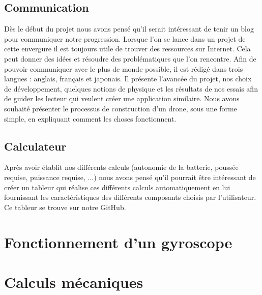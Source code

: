 \documentclass[a4paper,10pt]{report}
\begin{document}
      \section{Communication}
	Dès le début du projet nous avons pensé qu'il serait intéressant de 
tenir un blog pour communiquer notre progression. Lorsque l'on se lance dans un 
projet de cette envergure il est toujours utile de trouver des ressources sur 
Internet. Cela peut donner des idées et résoudre des problématiques que l'on 
rencontre. Afin de pouvoir communiquer avec le plus de monde possible, il est 
rédigé dans trois langues : anglais, français et japonais. Il présente 
l'avancée du projet, nos choix de développement, quelques notions de physique 
et les résultats de nos essais afin de guider les lecteur qui veulent créer une 
application similaire. Nous avons souhaité présenter le processus de 
construction d'un drone, sous une forme simple, en expliquant comment les 
choses fonctionnent.

      \section{Calculateur}
	Après avoir établit nos différents calculs (autonomie de la batterie, 
poussée requise, puissance requise, ...) nous avons pensé qu'il pourrait être 
intéressant de créer un tableur qui réalise ces différents calculs 
automatiquement en lui fournissant les caractéristiques des différents 
composants choisis par l'utilisateur. Ce tableur se trouve sur notre GitHub.
	
    \chapter{Fonctionnement d'un gyroscope}
    
    \chapter{Calculs mécaniques}

  \listoffigures
  
  \raggedright
  
  
\end{document}
